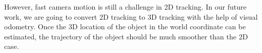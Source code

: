 \documentclass[10pt,twocolumn,letterpaper]{article}
\begin{document}
However, fast camera motion is still a challenge in 2D tracking. 
In our future work, we are going to convert 2D tracking to 3D tracking with the help of visual odometry. Once the 3D location of the object in the world coordinate can be estimated, the trajectory of the object should be much smoother than the 2D case. 






{\small


}
\end{document}
